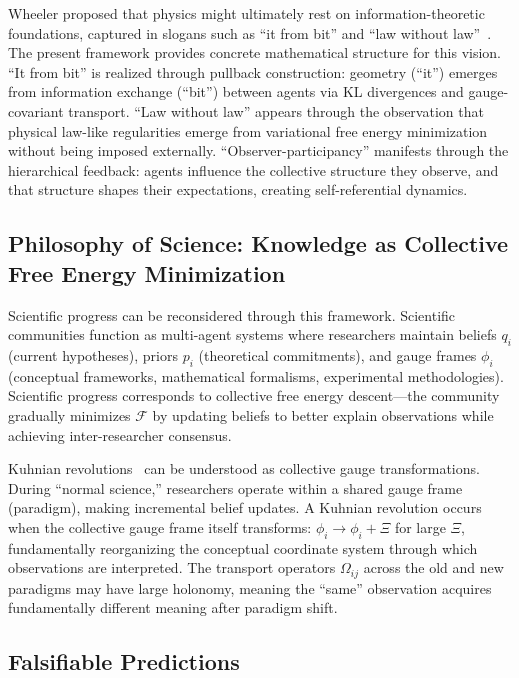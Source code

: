 \documentclass[11pt]{article}
\begin{document}
Wheeler proposed that physics might ultimately rest on information-theoretic foundations, captured in slogans such as ``it from bit'' and ``law without law''~\cite{Wheeler1990}. The present framework provides concrete mathematical structure for this vision. ``It from bit'' is realized through pullback construction: geometry (``it'') emerges from information exchange (``bit'') between agents via KL divergences and gauge-covariant transport. ``Law without law'' appears through the observation that physical law-like regularities emerge from variational free energy minimization without being imposed externally. ``Observer-participancy'' manifests through the hierarchical feedback: agents influence the collective structure they observe, and that structure shapes their expectations, creating self-referential dynamics.

\subsection{Philosophy of Science: Knowledge as Collective Free Energy Minimization}

Scientific progress can be reconsidered through this framework. Scientific communities function as multi-agent systems where researchers maintain beliefs $q_i$ (current hypotheses), priors $p_i$ (theoretical commitments), and gauge frames $\phi_i$ (conceptual frameworks, mathematical formalisms, experimental methodologies). Scientific progress corresponds to collective free energy descent---the community gradually minimizes $\mathcal{F}$ by updating beliefs to better explain observations while achieving inter-researcher consensus.

Kuhnian revolutions~\cite{Kuhn1962} can be understood as collective gauge transformations. During ``normal science,'' researchers operate within a shared gauge frame (paradigm), making incremental belief updates. A Kuhnian revolution occurs when the collective gauge frame itself transforms: $\phi_i \to \phi_i + \Xi$ for large $\Xi$, fundamentally reorganizing the conceptual coordinate system through which observations are interpreted. The transport operators $\Omega_{ij}$ across the old and new paradigms may have large holonomy, meaning the ``same'' observation acquires fundamentally different meaning after paradigm shift.

\subsection{Falsifiable Predictions}
\label{sec:predictions}
\end{document}
